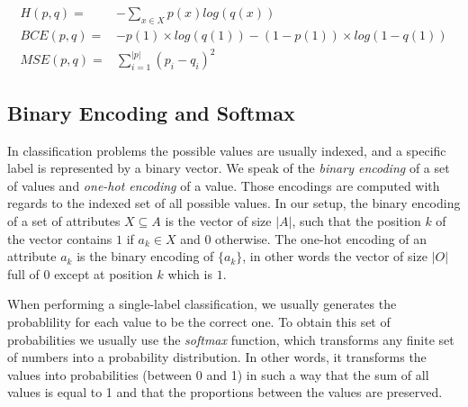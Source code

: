 \begin{align}
    H(p, q) =& - \sum_{x\in X} p(x) log(q(x)) \label{equ:ce}\\
    BCE(p, q) =& - p(1) \times log(q(1)) - (1-p(1)) \times log(1-q(1))\label{equ:bce}\\
    MSE(p, q) =& \sum_{i = 1}^{|p|}(p_i - q_i)^2\label{equ:mse}
\end{align}

\subsection{Binary Encoding and Softmax}
In classification problems the possible values are usually indexed, and a specific label is represented by a binary vector.
We speak of the \textit{binary encoding} of a set of values and \textit{one-hot encoding} of a value. Those encodings are computed with regards to the indexed set of all possible values.
In our setup, the binary encoding of a set of attributes $X \subseteq A$ is the vector of size $|A|$, such that the position $k$ of the vector contains $1$ if $a_k\in X$ and $0$ otherwise. The one-hot encoding of an attribute $a_k$ is the binary encoding of $\{a_k\}$, in other words the vector of size $|O|$ full of $0$ except at position $k$ which is $1$.

When performing a single-label classification, we usually generates the probablility for each value to be the correct one.
To obtain this set of probabilities we usually use the \textit{softmax} function, which transforms any finite set of numbers into a probability distribution.
In other words, it transforms the values into probabilities (between 0 and 1) in such a way that the sum of all values is equal to 1 and that the proportions between the values are preserved.



